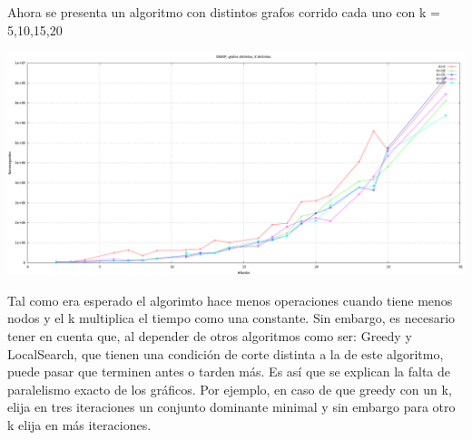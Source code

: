 Ahora se presenta un algoritmo con distintos grafos corrido cada uno con k = 5,10,15,20

\begin{center}
\includegraphics[width=15cm]{./graficos/GRASP_distGrafos_distK.png}
\end{center}

Tal como era esperado el algorimto hace menos operaciones cuando tiene menos nodos y el k multiplica el tiempo como una constante.
Sin embargo, es necesario tener en cuenta que, al depender de otros algoritmos como ser: Greedy y LocalSearch, que tienen una condición de corte distinta a la de este algoritmo, puede pasar que terminen antes o tarden más.
Es así que se explican la falta de paralelismo exacto de los gráficos. Por ejemplo, en caso de que greedy con un k, elija en tres iteraciones un conjunto dominante minimal y sin embargo para otro k elija en más iteraciones.
